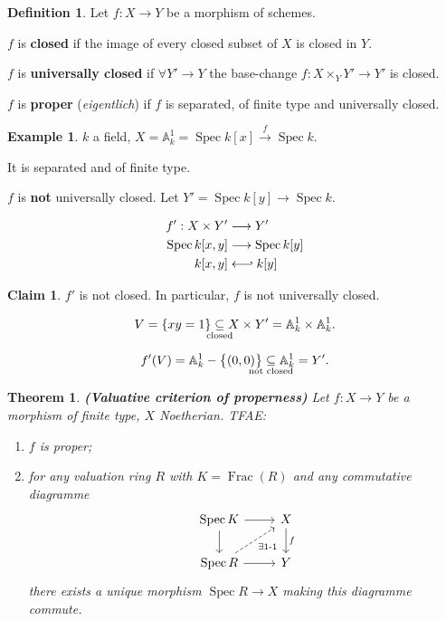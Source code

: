 \documentclass[12pt]{article}
\DeclareMathOperator{\Spec}{Spec}
\DeclareMathOperator{\Frac}{Frac}
\newtheorem*{theorem}{Theorem}
\theoremstyle{definition}
\newtheorem*{definition}{Definition}
\newtheorem*{claim}{Claim}
\newtheorem*{example}{Example}
\theoremstyle{remark}
\begin{document}
\begin{definition}
Let $f:X\rightarrow Y$ be a morphism of schemes.

$f$ is \textbf{closed} if the image of every closed subset of $X$ is closed in $Y$.

$f$ is \textbf{universally closed} if $\forall Y'\rightarrow Y$ the base-change $f:X\times_YY'\rightarrow Y'$ is closed.

$f$ is \textbf{proper} (\emph{eigentlich}) if $f$ is separated, of finite type and universally closed.
\end{definition}

\begin{example}
$k$ a field, $X=\mathbb{A}_k^1=\Spec k[x]\xrightarrow{f}\Spec k$.

It is separated and of finite type.

$f$ is \textbf{not} universally closed. Let $Y'=\Spec k[y]\rightarrow\Spec k$.

\begin{align*}
f':X\times Y'&\longrightarrow Y'\\
\Spec k[x,y]&\longrightarrow\Spec k[y]\\
k[x,y]&\longleftarrow\joinrel\rhook k[y]
\end{align*}

\begin{claim}
$f'$ is not closed. In particular, $f$ is not universally closed.
\end{claim}

\[V=\{xy=1\}\underset{\mathclap{\text{closed}}}{\subseteq}X\times Y'=\mathbb{A}_k^1\times\mathbb{A}_k^1.\]

\[f'(V)=\mathbb{A}_k^1-\big\{(0,0)\big\}\underset{\mathclap{\text{not closed}}}{\subseteq}\mathbb{A}_k^1=Y'.\]
\end{example}

\begin{theorem}
\emph{\textbf{(Valuative criterion of properness)}} Let $f:X\rightarrow Y$ be a morphism of finite type, $X$ Noetherian. TFAE:
\begin{enumerate}[label=\arabic*)]
\item $f$ is proper;
\item for any valuation ring $R$ with $K=\Frac(R)$ and any commutative diagramme
\[
\begin{tikzcd}
\Spec K\arrow[r]\arrow[d]&X\arrow[d,"f"]\\
\Spec R\arrow[r]\arrow[ru,dashed,"\exists1\text{-}1",swap]&Y
\end{tikzcd}
\]
there exists a unique morphism $\Spec R\rightarrow X$ making this diagramme commute.
\end{enumerate}
\end{theorem}
\end{document}
